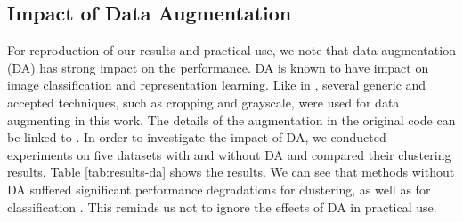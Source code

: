 \documentclass{article} \usepackage{iclr2021_conference,times}
\begin{document}
\subsection{Impact of Data Augmentation}
For reproduction of our results and practical use, we note that data augmentation (DA) has strong impact on the performance.
DA is known to have impact on image classification and representation learning.
Like in \cite{wu2018unsupervised}, several generic and accepted techniques, such as cropping and grayscale, were used for data augmenting in this work. The details of the augmentation in the original code can be linked to \cite{wu2018unsupervised}. In order to investigate the impact of DA, we conducted experiments on five datasets with and without DA and compared their clustering results.
Table \ref{tab:results-da} shows the results. 
We can see that methods without DA suffered significant performance degradations for clustering, as well as for classification \cite{simCLR}. This reminds us not to ignore the effects of DA in practical use.

\begin{table}[h]
  \caption{Clustering results (\%) with or without data augmentation on five datasets.
  }
  \label{tab:results-da}
  \centering
\end{table}
\end{document}
